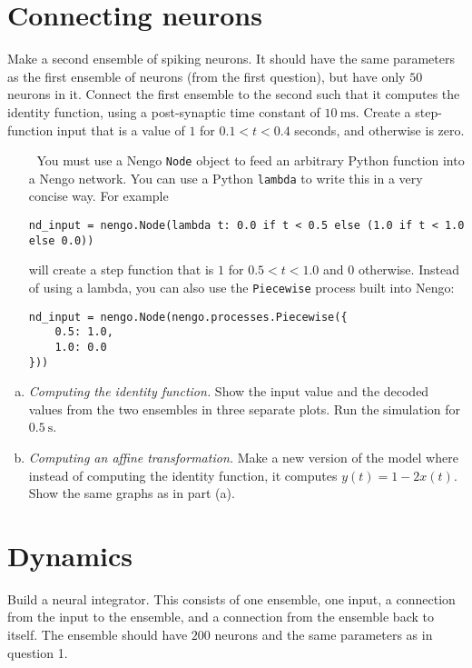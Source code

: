	\section{Connecting neurons}
	
	Make a second ensemble of spiking neurons. It should have the same parameters as the first ensemble of neurons (from the first question), but have only $50$ neurons in it. Connect the first ensemble to the second such that it computes the identity function, using a post-synaptic time constant of $\SI{10}{\milli\second}$. Create a step-function input that is a value of $1$ for $0.1<t<0.4$ seconds, and otherwise is zero.

	\begin{itemize}
		\item[{\symbolfont 🐍}] You must use a Nengo \texttt{Node} object to feed an arbitrary Python function into a Nengo network. You can use a Python \texttt{lambda} to write this in a very concise way. For example
		\begin{verbatim}
nd_input = nengo.Node(lambda t: 0.0 if t < 0.5 else (1.0 if t < 1.0 else 0.0))
		\end{verbatim}
		will create a step function that is $1$ for $0.5<t<1.0$ and $0$ otherwise. Instead of using a lambda, you can also use the \texttt{Piecewise} process built into Nengo:
		\begin{verbatim}
nd_input = nengo.Node(nengo.processes.Piecewise({
    0.5: 1.0,
    1.0: 0.0
}))
		\end{verbatim}
	\end{itemize}

	\begin{enumerate}[a)]
		\item {} \emph{Computing the identity function.} Show the input value and the decoded values from the two  ensembles in three separate plots. Run the simulation for $\SI{0.5}{\second}$.
		\item {} \emph{Computing an affine transformation.} Make a new version of the model where instead of computing the identity function, it computes $y(t) = 1 - 2x(t)$. Show the same graphs as in part (a).
	\end{enumerate}


	\section{Dynamics}
	
	Build a neural integrator. This consists of one ensemble, one input, a connection from the input to the ensemble, and a connection from the ensemble back to itself. The ensemble should have $200$ neurons and the same parameters as in question 1.
	
